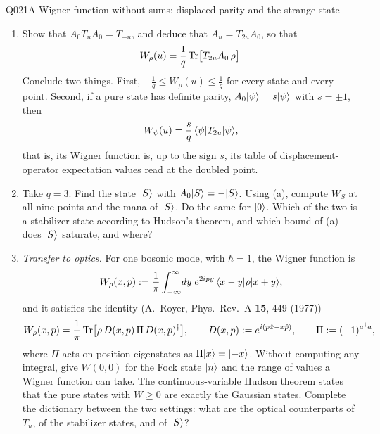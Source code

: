 \begin{entry}{Q021}{A Wigner function without sums: displaced parity and the strange state}
\begin{problem}
\begin{enumerate}[label=\textbf{(\alph*)},leftmargin=*]
  \item Show that $A_0T_uA_0=T_{-u}$, and deduce that $A_u=T_{2u}A_0$, so that
        \[
          W_\rho(u)=\frac1q\operatorname{Tr}\bigl[T_{2u}A_0\,\rho\bigr].
        \]
        Conclude two things. First, $-\tfrac1q\le W_\rho(u)\le\tfrac1q$ for every state and
        every point. Second, if a pure state has definite parity, $A_0\lvert \psi \rangle=s\lvert \psi \rangle$
        with $s=\pm1$, then
        \[
          W_\psi(u)=\frac{s}{q}\,\langle \psi \rvert T_{2u}\lvert \psi \rangle ,
        \]
        that is, its Wigner function is, up to the sign $s$, its table of
        displacement-operator expectation values read at the doubled point.
  \item Take $q=3$. Find the state $\lvert S \rangle$ with $A_0\lvert S \rangle=-\lvert S \rangle$. Using (a), compute
        $W_S$ at all nine points and the mana of $\lvert S \rangle$. Do the same for $\lvert 0 \rangle$. Which
        of the two is a stabilizer state according to Hudson's theorem, and which bound of
        (a) does $\lvert S \rangle$ saturate, and where?
  \item \emph{Transfer to optics.} For one bosonic mode, with $\hbar=1$, the Wigner
        function is
        \[
          W_\rho(x,p):=\frac1\pi\int_{-\infty}^{\infty}\!dy\;e^{2ipy}\,
          \langle x-y \rvert\rho\lvert x+y \rangle,
        \]
        and it satisfies the identity (A.~Royer, Phys.~Rev.~A \textbf{15}, 449 (1977))
        \[
          W_\rho(x,p)=\frac1\pi\operatorname{Tr}\bigl[\rho\,D(x,p)\,\Pi\,D(x,p)^{\dagger}\bigr],
          \qquad D(x,p):=e^{i(p\hat x-x\hat p)},\qquad \Pi:=(-1)^{a^{\dagger}a},
        \]
        where $\Pi$ acts on position eigenstates as $\Pi\lvert x \rangle=\lvert -x \rangle$. Without computing
        any integral, give $W(0,0)$ for the Fock state $\lvert n \rangle$ and the range of values a
        Wigner function can take. The continuous-variable Hudson theorem states that the
        pure states with $W\ge0$ are exactly the Gaussian states. Complete the dictionary
        between the two settings: what are the optical counterparts of $T_u$, of the
        stabilizer states, and of $\lvert S \rangle$?
\end{enumerate}
\end{problem}


\end{entry}
